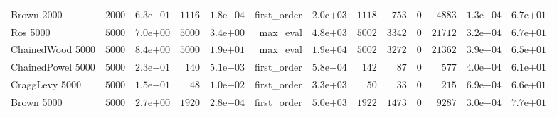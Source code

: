 \begin{longtable}[c]{lrrrrrrrrrrrr}
Brown 2000 & \( 2000\) & \( 6.3\)e\(-01\) & \( 1116\) & \( 1.8\)e\(-04\) & first\_order & \( 2.0\)e\(+03\) & \( 1118\) & \(  753\) & \(    0\) & \( 4883\) & \( 1.3\)e\(-04\) & \( 6.7\)e\(+01\) \\
Ros 5000 & \( 5000\) & \( 7.0\)e\(+00\) & \( 5000\) & \( 3.4\)e\(+00\) & max\_eval & \( 4.8\)e\(+03\) & \( 5002\) & \( 3342\) & \(    0\) & \(21712\) & \( 3.2\)e\(-04\) & \( 6.7\)e\(+01\) \\
ChainedWood 5000 & \( 5000\) & \( 8.4\)e\(+00\) & \( 5000\) & \( 1.9\)e\(+01\) & max\_eval & \( 1.9\)e\(+04\) & \( 5002\) & \( 3272\) & \(    0\) & \(21362\) & \( 3.9\)e\(-04\) & \( 6.5\)e\(+01\) \\
ChainedPowel 5000 & \( 5000\) & \( 2.3\)e\(-01\) & \(  140\) & \( 5.1\)e\(-03\) & first\_order & \( 5.8\)e\(-04\) & \(  142\) & \(   87\) & \(    0\) & \(  577\) & \( 4.0\)e\(-04\) & \( 6.1\)e\(+01\) \\
CraggLevy 5000 & \( 5000\) & \( 1.5\)e\(-01\) & \(   48\) & \( 1.0\)e\(-02\) & first\_order & \( 3.3\)e\(+03\) & \(   50\) & \(   33\) & \(    0\) & \(  215\) & \( 6.9\)e\(-04\) & \( 6.6\)e\(+01\) \\
Brown 5000 & \( 5000\) & \( 2.7\)e\(+00\) & \( 1920\) & \( 2.8\)e\(-04\) & first\_order & \( 5.0\)e\(+03\) & \( 1922\) & \( 1473\) & \(    0\) & \( 9287\) & \( 3.0\)e\(-04\) & \( 7.7\)e\(+01\) \\
\hline 
\end{longtable}



